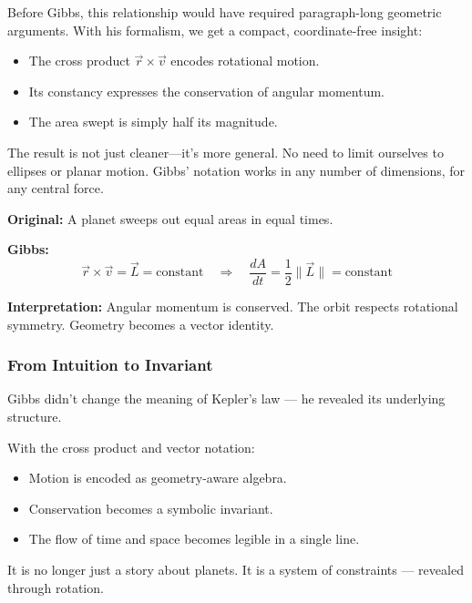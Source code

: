 Before Gibbs, this relationship would have required paragraph-long geometric arguments.  
With his formalism, we get a compact, coordinate-free insight:

\begin{itemize}
    \item The cross product \( \vec{r} \times \vec{v} \) encodes rotational motion.
    \item Its constancy expresses the conservation of angular momentum.
    \item The area swept is simply half its magnitude.
\end{itemize}

The result is not just cleaner—it’s more general.  
No need to limit ourselves to ellipses or planar motion. Gibbs’ notation works in any number of dimensions, for any central force.

\begin{tcolorbox}[colback=blue!5!white, colframe=blue!50!black, title={Kepler’s Law, in Gibbsian Notation}]
\textbf{Original:}  
A planet sweeps out equal areas in equal times.

\textbf{Gibbs:}  
\[
\vec{r} \times \vec{v} = \vec{L} = \text{constant}
\quad \Rightarrow \quad
\frac{dA}{dt} = \frac{1}{2} \|\vec{L}\| = \text{constant}
\]

\textbf{Interpretation:}  
Angular momentum is conserved.  
The orbit respects rotational symmetry.  
Geometry becomes a vector identity.
\end{tcolorbox}

\subsubsection{From Intuition to Invariant}

Gibbs didn’t change the meaning of Kepler’s law — he revealed its underlying structure.

With the cross product and vector notation:
\begin{itemize}
    \item Motion is encoded as geometry-aware algebra.
    \item Conservation becomes a symbolic invariant.
    \item The flow of time and space becomes legible in a single line.
\end{itemize}

It is no longer just a story about planets.  
It is a system of constraints — revealed through rotation.
